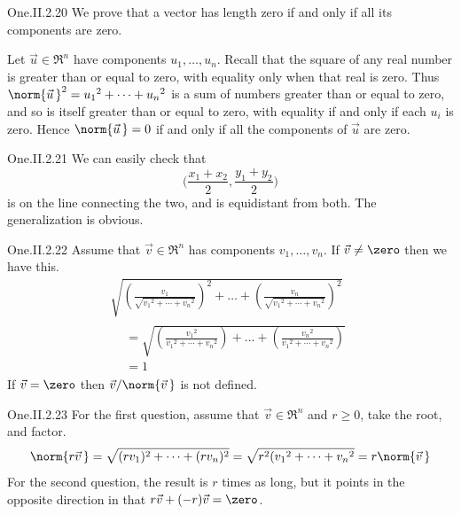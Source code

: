 \begin{ans}{One.II.2.20}
      We prove that a vector has length zero if and only if all its
      components are zero.

      Let \( \vec{u}\in\Re^n \) have components \( u_1,\ldots,u_n \).
      Recall that the square of any real number is greater than or equal to
      zero, with equality only when that real is zero.
      Thus
      \( \norm{\vec{u}\,}^2={u_1}^2+\cdots+{u_n}^2 \) is a sum of numbers
      greater than or equal to zero, and so is itself greater than or equal
      to zero, with equality if and only if each \( u_i \) is zero.
      Hence \( \norm{\vec{u}\,}=0 \) if and only if all the components of
      \( \vec{u} \) are zero.
    
\end{ans}
\begin{ans}{One.II.2.21}
      We can easily check that
      \begin{equation*}
        \bigl( \frac{x_1+x_2}{2},\frac{y_1+y_2}{2}  \bigr)
      \end{equation*}
      is on the line connecting the two, and is equidistant from both.
      The generalization is obvious.
    
\end{ans}
\begin{ans}{One.II.2.22}
      Assume that \( \vec{v}\in\Re^n \) has components \( v_1,\ldots,v_n \).
      If \( \vec{v}\neq \zero \) then we have this.
      \begin{multline*}
        \sqrt{\left(\frac{v_1}{\sqrt{{v_1}^2+\cdots+{v_n}^2}}\right)^2+
              \dots+\left(\frac{v_n}{\sqrt{{v_1}^2+\cdots+{v_n}^2}}\right)^2}
        \\
        \begin{aligned}
          &=\sqrt{\left(\frac{{v_1}^2}{{v_1}^2+\cdots+{v_n}^2}\right)+
              \dots+\left(\frac{{v_n}^2}{{v_1}^2+\cdots+{v_n}^2}\right)}   \\
          &=1
        \end{aligned}
      \end{multline*}
      If \( \vec{v}=\zero \) then \( \vec{v}/\norm{\vec{v}\,} \) is not
      defined.
    
\end{ans}
\begin{ans}{One.II.2.23}
      For the first question, assume that \( \vec{v}\in\Re^n \) and
      \( r\geq 0 \), take the root, and factor.
      \begin{equation*}
        \norm{r\vec{v}\,}
        =\sqrt{(rv_1)^2+\cdots+(rv_n)^2}
        =\sqrt{r^2({v_1}^2+\cdots+{v_n}^2}
        =r\norm{\vec{v}\,}
      \end{equation*}
      For the second question, the result is \( r \) times as long, but it
      points in the opposite direction in that
      \( r\vec{v}+(-r)\vec{v}=\zero \).
    
\end{ans}
